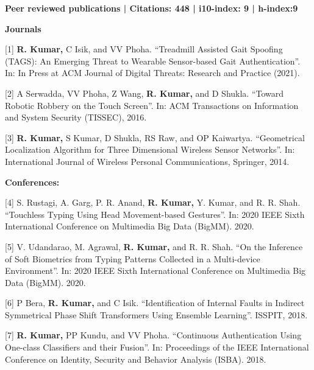 

\hspace{-0.5in}\textbf{Peer reviewed publications | Citations: 448 | i10-index: 9 | h-index:9}


\hspace{-0.5in}\textbf{Journals}

\hspace{-0.5in}[1] \textbf{R. Kumar,} C Isik, and VV Phoha. “Treadmill Assisted Gait Spoofing (TAGS): An Emerging Threat to Wearable Sensor-based Gait Authentication”. In: In Press at ACM Journal of Digital Threats: Research and Practice (2021).

\hspace{-0.5in}[2] A Serwadda, VV Phoha, Z Wang, \textbf{R. Kumar,} and D Shukla. “Toward Robotic Robbery on the Touch Screen”. In: ACM Transactions on Information and System Security (TISSEC), 2016.


\hspace{-0.5in}[3] \textbf{R. Kumar,} S Kumar, D Shukla, RS Raw, and OP Kaiwartya. “Geometrical Localization Algorithm for Three Dimensional Wireless Sensor Networks”. In: International Journal of Wireless Personal Communications, Springer, 2014.

\clearpage

\hspace{-0.5in}\textbf{Conferences:}

\hspace{-0.5in}[4] S. Rustagi, A. Garg, P. R. Anand, \textbf{R. Kumar,} Y. Kumar, and R. R. Shah. “Touchless Typing
Using Head Movement-based Gestures”. In: 2020 IEEE Sixth International Conference on
Multimedia Big Data (BigMM). 2020.

\hspace{-0.5in}[5] V. Udandarao, M. Agrawal, \textbf{R. Kumar,} and R. R. Shah. “On the Inference of Soft
Biometrics from Typing Patterns Collected in a Multi-device Environment”. In: 2020 IEEE
Sixth International Conference on Multimedia Big Data (BigMM). 2020.

\hspace{-0.5in}[6] P Bera, \textbf{R. Kumar,} and C Isik. “Identification of Internal Faults in Indirect Symmetrical Phase Shift Transformers Using Ensemble Learning”. ISSPIT, 2018.

\hspace{-0.5in}[7] \textbf{R. Kumar,} PP Kundu, and VV Phoha. “Continuous Authentication Using One-class Classifiers and their Fusion”. In: Proceedings of the IEEE International Conference on Identity, Security and Behavior Analysis (ISBA). 2018.

